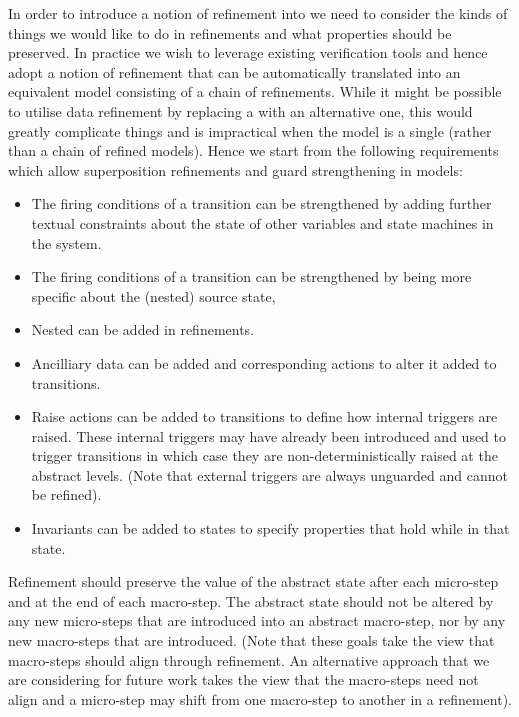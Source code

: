 In order to introduce a notion of refinement into \SCXML we need to consider the kinds of things we would like to do in refinements and what properties should be preserved.
In practice we wish to leverage existing \EventB verification tools and hence adopt a notion of refinement that can be automatically translated into an equivalent \EventB model consisting of a chain of refinements. While it might be possible to utilise data refinement by replacing a \Statechart with an alternative one, this would greatly complicate things and is impractical when the \SCXML model is a single \Statechart (rather than a chain of refined models). Hence we start from the following requirements which allow superposition refinements and guard strengthening in \SCXML models:
\begin{itemize}
	\item The firing conditions of a transition can be strengthened by adding further textual constraints about the state of other variables and state machines in the system.
	\item The firing conditions of a transition can be strengthened by being more specific about the (nested) source state,
	\item Nested \Statecharts can be added in refinements.
	\item Ancilliary data can be added and corresponding actions to alter it added to transitions.
	\item Raise actions can be added to transitions to define how internal triggers are raised. These internal triggers may have already been introduced and used to trigger transitions in which case they are non-deterministically raised at the abstract levels. (Note that external triggers are always unguarded and cannot be refined).
	\item Invariants can be added to states to specify properties that hold while in that state.
\end{itemize}

Refinement should preserve the value of the abstract state after each micro-step and at the end of each macro-step. The abstract state should not be altered by any new micro-steps that are introduced into an abstract macro-step, nor by any new macro-steps that are introduced. (Note that these goals take the view that macro-steps should align through refinement. An alternative approach that we are considering for future work takes the view that the macro-steps need not align and a micro-step may shift from one macro-step to another in a refinement). 

